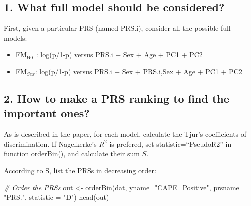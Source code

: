 \documentclass[
]{article}
\newenvironment{Shaded}{\begin{snugshade}}{\end{snugshade}}
\newcommand{\AttributeTok}[1]{\textcolor[rgb]{0.77,0.63,0.00}{#1}}
\newcommand{\CommentTok}[1]{\textcolor[rgb]{0.56,0.35,0.01}{\textit{#1}}}
\newcommand{\FunctionTok}[1]{\textcolor[rgb]{0.00,0.00,0.00}{#1}}
\newcommand{\NormalTok}[1]{#1}
\newcommand{\OtherTok}[1]{\textcolor[rgb]{0.56,0.35,0.01}{#1}}
\newcommand{\SpecialCharTok}[1]{\textcolor[rgb]{0.00,0.00,0.00}{#1}}
\newcommand{\StringTok}[1]{\textcolor[rgb]{0.31,0.60,0.02}{#1}}
\providecommand{\tightlist}{%
  \setlength{\itemsep}{0pt}\setlength{\parskip}{0pt}}
\begin{document}
\begin{Shaded}
\end{Shaded}

\hypertarget{what-full-model-should-be-considered}{%
\subsection{1. What full model should be
considered?}\label{what-full-model-should-be-considered}}

First, given a particular PRS (named PRS.i), consider all the possible
full models:

\begin{itemize}
\tightlist
\item
  FM\(_{WI}\) : log(p/1-p) versus PRS.i + Sex + Age + PC1 + PC2
\item
  FM\(_{Sex}\): log(p/1-p) versus PRS.i + Sex + PRS.i,Sex + Age + PC1 +
  PC2
\end{itemize}

\hypertarget{how-to-make-a-prs-ranking-to-find-the-important-ones}{%
\subsection{2. How to make a PRS ranking to find the important
ones?}\label{how-to-make-a-prs-ranking-to-find-the-important-ones}}

As is described in the paper, for each model, calculate the Tjur's
coefficients of discrimination. If Nagelkerke's \(R^2\) is prefered, set
statistic=``PseudoR2'' in function orderBin(), and calculate their sum
\(S\).

According to S, list the PRSs in decreasing order:

\begin{Shaded}
\begin{Highlighting}[]
\CommentTok{\# Order the PRSs}
\NormalTok{out }\OtherTok{\textless{}{-}} \FunctionTok{orderBin}\NormalTok{(dat, }\AttributeTok{yname=}\StringTok{"CAPE\_Positive"}\NormalTok{, }\AttributeTok{prsname =} \StringTok{"PRS."}\NormalTok{, }\AttributeTok{statistic =} \StringTok{"D"}\NormalTok{)}
\FunctionTok{head}\NormalTok{(out)}
\end{Highlighting}
\end{Shaded}
\end{document}
